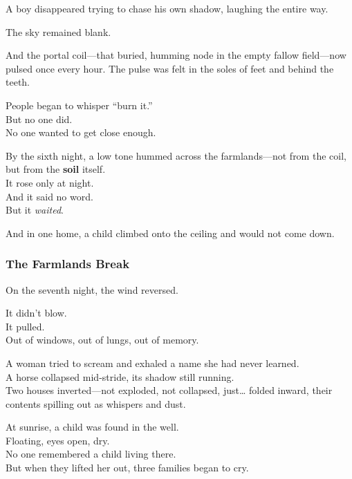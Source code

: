 \documentclass[12pt]{article}
\begin{document}
\vspace{0.5em}
A boy disappeared trying to chase his own shadow, laughing the entire way.

\vspace{0.5em}
The sky remained blank.

\vspace{0.5em}
And the portal coil---that buried, humming node in the empty fallow field---now pulsed once every hour. The pulse was felt in the soles of feet and behind the teeth.

\vspace{0.5em}
People began to whisper ``burn it.''\\
But no one did.\\
No one wanted to get close enough.

\vspace{0.5em}
By the sixth night, a low tone hummed across the farmlands---not from the coil, but from the \textbf{soil} itself.\\
It rose only at night.\\
And it said no word.\\
But it \textit{waited}.

\vspace{0.5em}
And in one home, a child climbed onto the ceiling and would not come down.

\dotfill

\subsubsection*{The Farmlands Break}

On the seventh night, the wind reversed.

\vspace{0.5em}
It didn’t blow.\\
It pulled.\\
Out of windows, out of lungs, out of memory.

\vspace{0.5em}
A woman tried to scream and exhaled a name she had never learned.\\
A horse collapsed mid-stride, its shadow still running.\\
Two houses inverted---not exploded, not collapsed, just\ldots{} folded inward, their contents spilling out as whispers and dust.

\vspace{0.5em}
At sunrise, a child was found in the well.\\
Floating, eyes open, dry.\\
No one remembered a child living there.\\
But when they lifted her out, three families began to cry.
\end{document}
